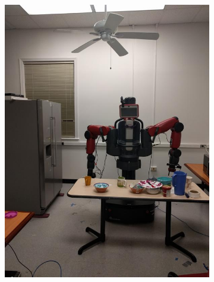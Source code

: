 \documentclass[12pt]{article}
\begin{document}
\begin{figure}[t!]
\begin{subfigure}[t]{0.1\textwidth}
        \includegraphics[width=\linewidth]{../Images/Set3/4}
    \end{subfigure}
    \begin{subfigure}[t]{0.1\textwidth}
        \centering

\end{subfigure}
\end{figure}
\end{document}
